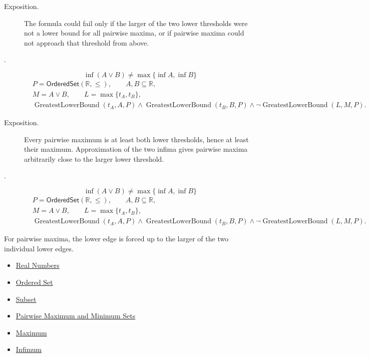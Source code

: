 \begin{remark*}
\begin{description}
\item[Exposition.]
The formula could fail only if the larger of the two lower thresholds were not
a lower bound for all pairwise maxima, or if pairwise maxima could not approach
that threshold from above.


  \item[.]
  \[
\inf(A\vee B)\neq\max\{\inf A,\inf B\}
\]
\[
\begin{aligned}
&P=\mathsf{OrderedSet}(\mathbb{R},\leq),\qquad A,B\subseteq\mathbb{R},\\
&M=A\vee B,\qquad L=\max\{t_A,t_B\},\\
&\operatorname{GreatestLowerBound}(t_A,A,P)\land\operatorname{GreatestLowerBound}(t_B,B,P)\land
\neg\operatorname{GreatestLowerBound}(L,M,P).
\end{aligned}
\]
\end{description}
\end{remark*}

\begin{remark*}
\begin{description}
\item[Exposition.]
Every pairwise maximum is at least both lower thresholds, hence at least their
maximum.  Approximation of the two infima gives pairwise maxima arbitrarily
close to the larger lower threshold.


  \item[.]
  \[
\inf(A\vee B)\neq\max\{\inf A,\inf B\}
\]
\[
\begin{aligned}
&P=\mathsf{OrderedSet}(\mathbb{R},\leq),\qquad A,B\subseteq\mathbb{R},\\
&M=A\vee B,\qquad L=\max\{t_A,t_B\},\\
&\operatorname{GreatestLowerBound}(t_A,A,P)\land\operatorname{GreatestLowerBound}(t_B,B,P)\land
\neg\operatorname{GreatestLowerBound}(L,M,P).
\end{aligned}
\]
\end{description}
\end{remark*}

\begin{remark*}[Interpretation]
For pairwise maxima, the lower edge is forced up to the larger of the two
individual lower edges.
\end{remark*}

\begin{dependencies}
\begin{itemize}
  \item \hyperref[def:reals]{Real Numbers}
  \item \hyperref[def:ordered-set]{Ordered Set}
  \item \hyperref[def:subset]{Subset}
  \item \hyperref[def:pairwise-maximum-minimum-sets]{Pairwise Maximum and Minimum Sets}
  \item \hyperref[def:maximum]{Maximum}
  \item \hyperref[def:infimum]{Infimum}
\end{itemize}
\end{dependencies}

